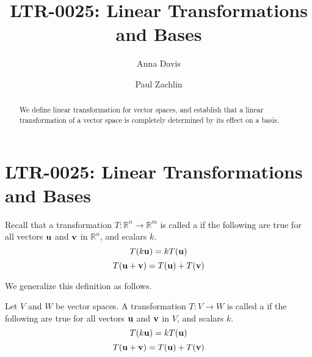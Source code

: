 \documentclass{ximera}
\author{Anna Davis \and Paul Zachlin} \title{LTR-0025: Linear Transformations and Bases} \license{CC-BY 4.0}
\begin{document}
\begin{abstract}
We define linear transformation for vector spaces, and  establish that a linear transformation of a vector space is completely determined by its effect on a basis. 
\end{abstract}
\maketitle

\section*{LTR-0025: Linear Transformations and Bases}

Recall that a transformation $T:\mathbb{R}^n\rightarrow \mathbb{R}^m$ is called a  if the following are true for all vectors ${\bf u}$ and ${\bf v}$ in $\mathbb{R}^n$, and scalars $k$.
\begin{equation*}
T(k{\bf u})= kT({\bf u})
\end{equation*}
\begin{equation*}
T({\bf u}+{\bf v})= T({\bf u})+T({\bf v})
\end{equation*}

We generalize this definition as follows.

\begin{definition}\label{def:lintransgeneral}
Let $V$ and $W$ be vector spaces. A transformation $T:V\rightarrow W$ is called a  if the following are true for all vectors ${\bf u}$ and ${\bf v}$ in $V$, and scalars $k$.
\begin{equation*}
T(k{\bf u})= kT({\bf u})
\end{equation*}
\begin{equation*}
T({\bf u}+{\bf v})= T({\bf u})+T({\bf v})
\end{equation*}
\end{definition}
\end{document}
